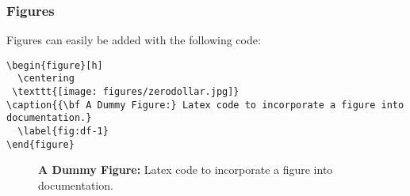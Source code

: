 \documentclass[12pt]{article}
\begin{document}
\subsubsection*{Figures}

Figures can easily be added with the following code:

\begin{verbatim}
\begin{figure}[h]
  \centering
 \texttt{[image: figures/zerodollar.jpg]}
\caption{{\bf A Dummy Figure:} Latex code to incorporate a figure into
documentation.}
  \label{fig:df-1}
\end{figure}
\end{verbatim}

\begin{figure}[h]
  \centering
\caption{{\bf A Dummy Figure:} Latex code to incorporate a figure into documentation.}
  \label{fig:df-1}
\end{figure}
\end{document}
